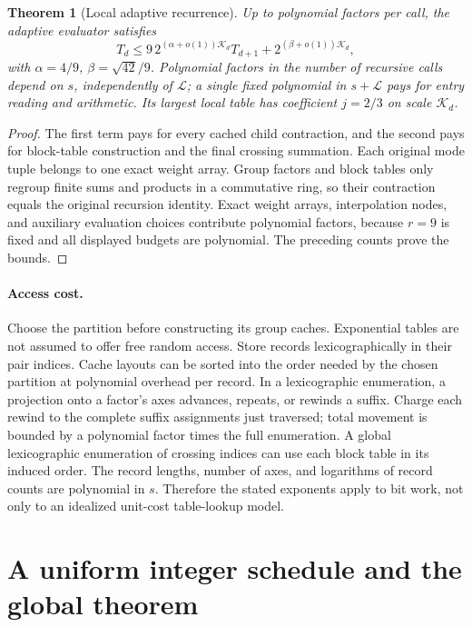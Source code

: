 \documentclass[11pt]{article}
\newtheorem{theorem}{Theorem}[section]
\theoremstyle{definition}\newtheorem{definition}[theorem]{Definition}
\theoremstyle{remark}\newtheorem{remark}[theorem]{Remark}
\newcommand{\K}{\mathcal K}
\begin{document}
\begin{theorem}[Local adaptive recurrence]\label{thm:local}
Up to polynomial factors per call, the adaptive evaluator satisfies
\begin{equation}
 T_d\le 9\,2^{(\alpha+o(1))\K_d}T_{d+1}
       +2^{(\beta+o(1))\K_d},\label{eq:recurrence}
\end{equation}
with $\alpha=4/9$, $\beta=\sqrt{42}/9$. Polynomial factors in the number
of recursive calls depend on $s$, independently of $\mathcal L$; a single
fixed polynomial in $s+\mathcal L$ pays for entry reading and arithmetic.
Its largest local table has
coefficient $j=2/3$ on scale $\K_d$.
\end{theorem}
\begin{proof}
The first term pays for every cached child contraction, and the second pays
for block-table construction and the final crossing summation. Each original
mode tuple belongs to one exact weight array. Group factors and block tables
only regroup finite sums and products in a commutative ring, so their
contraction equals the original recursion identity. Exact weight arrays,
interpolation nodes, and auxiliary evaluation choices contribute polynomial
factors, because $r=9$ is fixed and all displayed budgets are polynomial.
The preceding counts prove the bounds.
\end{proof}

\paragraph{Access cost.}
Choose the partition before constructing its group caches. Exponential tables
are not assumed to offer free random access. Store records
lexicographically in their pair indices. Cache layouts can be sorted into
the order needed by the chosen partition at polynomial overhead per record.
In a lexicographic enumeration, a projection onto a factor's axes advances,
repeats, or rewinds a suffix. Charge each rewind to the complete suffix
assignments just traversed; total movement is bounded by a polynomial factor
times the full enumeration. A global lexicographic enumeration of crossing
indices can use each block table in its induced order. The record lengths,
number of axes, and logarithms of record counts are polynomial in $s$.
Therefore the stated exponents apply to bit work, not only to an idealized
unit-cost table-lookup model.

\section{A uniform integer schedule and the global theorem}
\label{sec:schedule}
\end{document}
